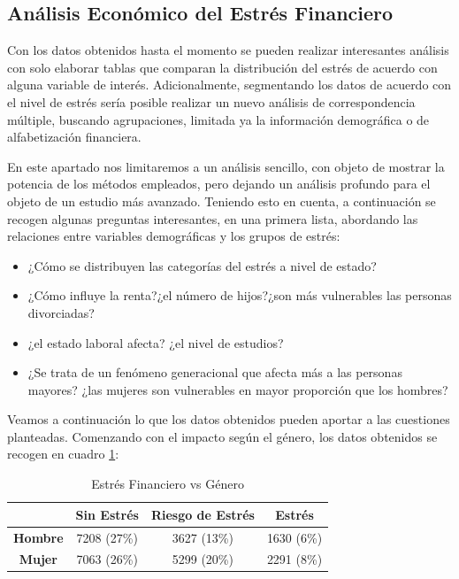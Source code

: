 \documentclass[a4paper, 11pt]{article}
\begin{document}
\subsection{Análisis Económico del Estrés Financiero}
Con los datos obtenidos hasta el momento se pueden realizar interesantes análisis con
solo elaborar tablas que comparan la distribución del estrés de acuerdo con alguna variable
de interés. Adicionalmente, segmentando los datos de acuerdo con el nivel de estrés sería 
posible realizar un nuevo análisis de correspondencia múltiple, buscando agrupaciones,
limitada ya la información demográfica o de alfabetización financiera. 

En este apartado nos limitaremos a un análisis sencillo, con objeto de 
mostrar la potencia de los métodos empleados, pero dejando un análisis profundo
para el objeto de un estudio más avanzado. Teniendo esto en cuenta, a continuación
se recogen algunas preguntas interesantes, en una primera lista, abordando las
relaciones entre variables demográficas y los grupos de estrés:
\begin{itemize}
    \item ¿Cómo se distribuyen las categorías del estrés a nivel de estado?
    \item ¿Cómo influye la renta?¿el número de hijos?¿son más vulnerables las personas
    divorciadas?
    \item ¿el estado laboral afecta? ¿el nivel de estudios?
    \item ¿Se trata de un fenómeno generacional que afecta más a las personas mayores? ¿las
    mujeres son vulnerables en mayor proporción que los hombres?
\end{itemize}

Veamos a continuación lo que los datos obtenidos pueden aportar a las cuestiones 
planteadas. Comenzando con el impacto según el género, los datos obtenidos se 
recogen en cuadro \ref{tab:stress_vs_gender}:

\begin{table}[ht]
\centering
\begin{tabular}{cccc }
\toprule
 & \textbf{Sin Estrés} & \textbf{Riesgo de Estrés} & \textbf{Estrés}\\
\midrule
\textbf{Hombre} & 7208 (27\%) & 3627 (13\%)& 1630 (6\%)\\
\textbf{Mujer} & 7063 (26\%)& 5299 (20\%)& 2291 (8\%)\\
\bottomrule
\end{tabular}
\caption{Estrés Financiero vs Género}
\label{tab:stress_vs_gender}
\end{table}
\end{document}
